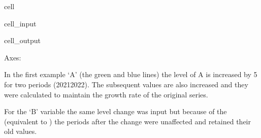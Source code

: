 \documentclass[letterpaper,10pt,english]{jupyterBook}
\begin{document}
\begin{sphinxuseclass}{cell}\begin{sphinxVerbatimInput}

\begin{sphinxuseclass}{cell_input}
\begin{sphinxVerbatim}[commandchars=\\\{\}]

\PYG{p}{[}\PYG{p}{[}\PYG{p}{]}\PYG{p}{]}

\end{sphinxVerbatim}

\end{sphinxuseclass}\end{sphinxVerbatimInput}
\begin{sphinxVerbatimOutput}

\begin{sphinxuseclass}{cell_output}
\begin{sphinxVerbatim}[commandchars=\\\{\}]
\PYGZlt{}Axes: \PYGZgt{}
\end{sphinxVerbatim}

\noindent{}

\end{sphinxuseclass}\end{sphinxVerbatimOutput}

\end{sphinxuseclass}
\sphinxAtStartPar
In the first example ‘A’ (the green and blue lines) the level of A is increased by 5 for two periods (2021\sphinxhyphen{}2022). The subsequent values are also increased and they were calculated to maintain the growth rate of the original series.

\sphinxAtStartPar
For the ‘B’ variable the same level change was input but because of the  (equivalent to ) the periods after the change were unaffected and retained their old values.
\end{document}
